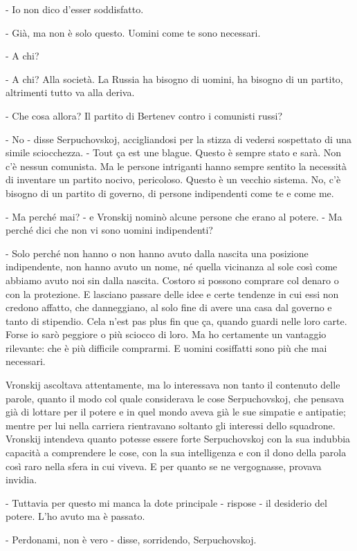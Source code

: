 - Io non dico d'esser soddisfatto. 

- Già, ma non è solo questo. Uomini come te sono necessari. 

- A chi? 

- A chi? Alla società. La Russia ha bisogno di uomini, ha bisogno di un partito, altrimenti tutto va alla deriva. 

- Che cosa allora? Il partito di Bertenev contro i comunisti russi? 

- No - disse Serpuchovskoj, accigliandosi per la stizza di vedersi sospettato di una simile sciocchezza. - Tout ça est une blague. Questo è sempre stato e sarà. Non c'è nessun comunista. Ma le persone intriganti hanno sempre sentito la necessità di inventare un partito nocivo, pericoloso. Questo è un vecchio sistema. No, c'è bisogno di un partito di governo, di persone indipendenti come te e come me. 

- Ma perché mai? - e Vronskij nominò alcune persone che erano al potere. - Ma perché dici che non vi sono uomini indipendenti? 

- Solo perché non hanno o non hanno avuto dalla nascita una posizione indipendente, non hanno avuto un nome, né quella vicinanza al sole così come abbiamo avuto noi sin dalla nascita. Costoro si possono comprare col denaro o con la protezione. E lasciano passare delle idee e certe tendenze in cui essi non credono affatto, che danneggiano, al solo fine di avere una casa dal governo e tanto di stipendio. Cela n'est pas plus fin que ça, quando guardi nelle loro carte. Forse io sarò peggiore o più sciocco di loro. Ma ho certamente un vantaggio rilevante: che è più difficile comprarmi. E uomini cosiffatti sono più che mai necessari. 

Vronskij ascoltava attentamente, ma lo interessava non tanto il contenuto delle parole, quanto il modo col quale considerava le cose Serpuchovskoj, che pensava già di lottare per il potere e in quel mondo aveva già le sue simpatie e antipatie; mentre per lui nella carriera rientravano soltanto gli interessi dello squadrone. Vronskij intendeva quanto potesse essere forte Serpuchovskoj con la sua indubbia capacità a comprendere le cose, con la sua intelligenza e con il dono della parola così raro nella sfera in cui viveva. E per quanto se ne vergognasse, provava invidia. 

- Tuttavia per questo mi manca la dote principale - rispose - il desiderio del potere. L'ho avuto ma è passato. 

- Perdonami, non è vero - disse, sorridendo, Serpuchovskoj. 

